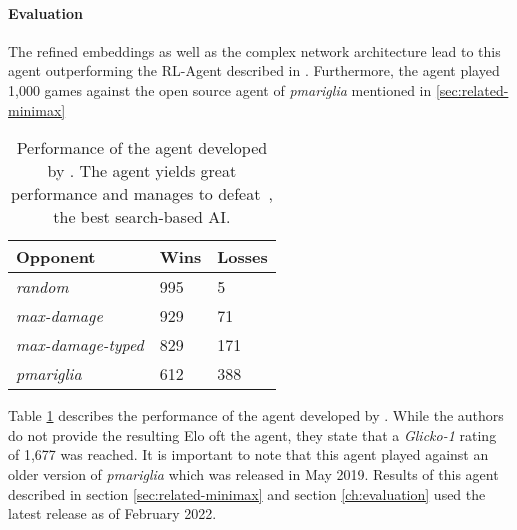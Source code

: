 \paragraph{Evaluation}
\label{sec:dqn-evaluation}
The refined embeddings as well as the complex network architecture lead to this agent outperforming
the RL-Agent described in \cite{GottaTrainEmAll}. Furthermore, the agent played 1,000 games against
the open source agent of \textit{pmariglia} mentioned in \ref{sec:related-minimax}
\begin{table}[h]
    \centering
    \caption{Performance of the agent developed by \cite{Huang_Lee_2019}. The agent yields great performance
    and manages to defeat~\cite{Github:pmariglia-showdown}, the best search-based AI.}
    \label{tbl:State-Of-The-Art-Results}
        \begin{tabular}{|l|l|l|}
            \hline
            \textbf{Opponent} & \textbf{Wins} & \textbf{Losses} \\
            \hline
            \emph{random} & 995 & 5 \\
            \hline
            \emph{max-damage} & 929 & 71 \\
            \hline
            \emph{max-damage-typed} & 829 & 171 \\
            \hline
            \emph{pmariglia} & 612 & 388 \\
            \hline
        \end{tabular}
\end{table} 
Table \ref{tbl:State-Of-The-Art-Results} describes the performance of the agent developed by
\cite{Huang_Lee_2019}.
While the authors do not provide the resulting Elo oft the agent, they state that a 
\textit{Glicko-1} rating of 1,677 was reached. It is important to note that this agent played
against an older version of \textit{pmariglia} which was released in May 2019. Results
of this agent described in section \ref{sec:related-minimax} and section \ref{ch:evaluation} 
used the latest release as of February 2022.

